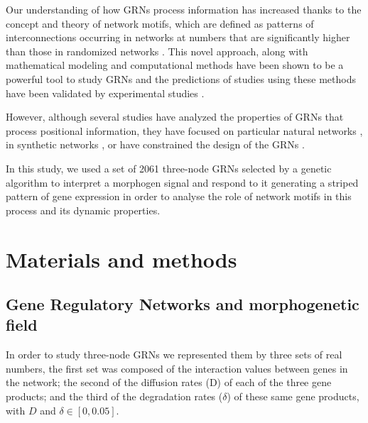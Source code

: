 \documentclass[10pt,letterpaper]{article}
\begin{document}
Our understanding of how GRNs process information has increased thanks to the
concept and theory of network motifs, which are defined as patterns of
interconnections occurring in networks at numbers that are significantly higher
than those in randomized networks \cite{Milo2002}. This novel approach, along
with mathematical modeling and computational methods have been shown to be a
powerful tool to study GRNs and the predictions of studies using these methods
have been validated by experimental studies
\cite{Kalir2005,Kalir2004,Mangan2003a,ODonnell2005,Basu2005}.

However, although several studies have analyzed the properties of GRNs that
process positional information, they have focused on particular natural networks
\cite{Schaerli2014,Jaeger2004}, in synthetic networks
\cite{Basu2005,Reinitz1995,Schaerli2018}, or have constrained the design of the
GRNs \cite{Elowitz2000}.

In this study, we used a set of 2061 three-node GRNs selected by a genetic
algorithm to interpret a morphogen signal and respond to it generating a
striped pattern of gene expression in order to analyse the role of network 
motifs in this process and its dynamic properties.



\section*{Materials and methods}
\subsection*{Gene Regulatory Networks and morphogenetic field}

In order to study three-node GRNs we represented them by three sets of real 
numbers, the first set was composed of the interaction values
between genes in the network; the second of the diffusion rates (D) of each of 
the three gene products; and the third of the degradation rates ($\delta$) of 
these same gene products, with $D$ and $\delta  \in [0, 0.05]$.\\
\end{document}
